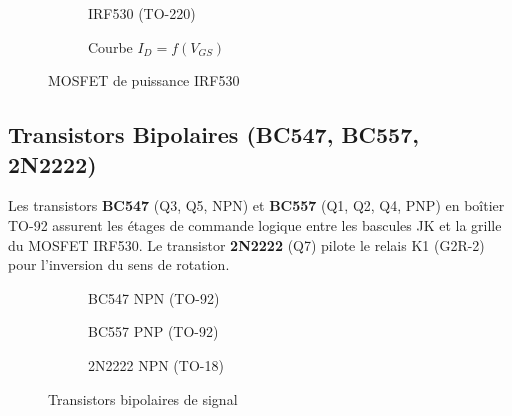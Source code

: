 \documentclass[a4paper,12pt,openany]{book}
\begin{document}
\begin{figure}[H]
  \centering
  \begin{subfigure}[b]{0.45\textwidth}
    \centering
    \caption{IRF530 (TO-220)}
  \end{subfigure}
  \hfill
  \begin{subfigure}[b]{0.50\textwidth}
    \centering
    \caption{Courbe $I_D = f(V_{GS})$}
  \end{subfigure}
  \caption{MOSFET de puissance IRF530}
  \label{fig:irf530}
\end{figure}

\subsection{Transistors Bipolaires (BC547, BC557, 2N2222)}

Les transistors \textbf{BC547} (Q3, Q5, NPN) et \textbf{BC557} (Q1, Q2,
Q4, PNP) en bo\^itier TO-92 assurent les \'etages de commande logique entre
les bascules JK et la grille du MOSFET IRF530. Le transistor
\textbf{2N2222} (Q7) pilote le relais K1 (G2R-2) pour l'inversion du sens
de rotation.

\begin{figure}[H]
  \centering
  \begin{subfigure}[b]{0.30\textwidth}
    \centering
    \caption{BC547 NPN (TO-92)}
  \end{subfigure}
  \hfill
  \begin{subfigure}[b]{0.30\textwidth}
    \centering
    \caption{BC557 PNP (TO-92)}
  \end{subfigure}
  \hfill
  \begin{subfigure}[b]{0.30\textwidth}
    \centering
    \caption{2N2222 NPN (TO-18)}
  \end{subfigure}
  \caption{Transistors bipolaires de signal}
  \label{fig:bjt}
\end{figure}
\end{document}

